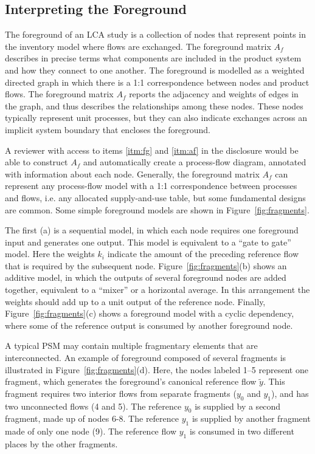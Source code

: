 \subsection{Interpreting the Foreground}

The foreground of an LCA study is a collection of nodes that represent points in the inventory model where flows are exchanged.  The foreground matrix $A_f$ describes in precise terms what components are included in the product system and how they connect to one another.  The foreground is modelled as a weighted directed graph in which there is a 1:1 correspondence between nodes and product flows.  The foreground matrix $A_f$ reports the adjacency and weights of edges in the graph, and thus describes the relationships among these nodes.  These nodes typically represent unit processes, but they can also indicate exchanges across an implicit system boundary that encloses the foreground.

A reviewer with access to items \ref{itm:fg} and \ref{itm:af} in the disclosure would be able to construct $A_f$ and automatically create a process-flow diagram, annotated with information about each node.  Generally, the foreground matrix $A_f$ can represent any process-flow model with a 1:1 correspondence between processes and flows, i.e. any allocated supply-and-use table, but some fundamental designs are common.  Some simple foreground models are shown in Figure~\ref{fig:fragments}.  



The first (a) is a sequential model, in which each node requires one foreground input and generates one output. This model is equivalent to a ``gate to gate'' model.  Here the weights $k_i$ indicate the amount of the preceding reference flow that is required by the subsequent node.  Figure~\ref{fig:fragments}(b) shows an additive model, in which the outputs of several foreground nodes are added together, equivalent to a ``mixer'' or a horizontal average.  In this arrangement the weights %
should add up to a unit output of the reference node.  Finally, Figure~\ref{fig:fragments}(c) shows a foreground model with a cyclic dependency, where some of the reference output is consumed by another foreground node.

A typical PSM may contain multiple fragmentary elements that are interconnected.  An example of foreground composed of several fragments is illustrated in Figure~\ref{fig:fragments}(d).  Here, the nodes labeled 1--5 represent one fragment, which generates the foreground's canonical reference flow $\tilde{y}$. This fragment requires two interior flows from separate fragments ($y_0$ and $y_1$), and has two unconnected flows (4 and 5).  The reference $y_0$ is supplied by a second fragment, made up of nodes 6-8.  The reference $y_1$ is supplied by another fragment made of only one node (9). The reference flow $y_1$ is consumed in two different places by the other fragments.




